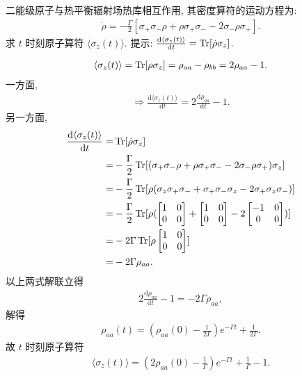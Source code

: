 \documentclass{assignment}
\begin{document}
\begin{prob}
    二能级原子与热平衡辐射场热库相互作用, 其密度算符的运动方程为:
    \begin{align}
        \dot{\rho}=-\frac{\Gamma}{2}[\sigma_+\sigma_-\rho+\rho\sigma_+\sigma_--2\sigma_-\rho\sigma_+].
    \end{align}
    求 $t$ 时刻原子算符 $\langle\sigma_z(t)\rangle$. 提示: $\frac{\mathrm{d}\langle\sigma_z(t)\rangle}{\mathrm{d}t}=\operatorname{Tr}[\dot{\rho}\sigma_z]$.
\end{prob}
\begin{sol}
    \begin{align}
        \langle\sigma_z(t)\rangle=\operatorname{Tr}[\rho\sigma_z]=\rho_{aa}-\rho_{bb}=2\rho_{aa}-1.
    \end{align}
    一方面,
    \begin{align}
        \Longrightarrow\frac{\mathrm{d}\langle\sigma_z(t)\rangle}{\mathrm{d}t}=2\frac{\mathrm{d}\rho_{aa}}{\mathrm{d}t}-1.
    \end{align}
    另一方面,
    \begin{align}
        \notag\frac{\mathrm{d}\langle\sigma_z(t)\rangle}{\mathrm{d}t}=&\operatorname{Tr}[\dot{\rho}\sigma_z]\\
        \notag=&-\frac{\Gamma}{2}\operatorname{Tr}[(\sigma_+\sigma_-\rho+\rho\sigma_+\sigma_--2\sigma_-\rho\sigma_+)\sigma_z]\\
        \notag=&-\frac{\Gamma}{2}\operatorname{Tr}[\rho(\sigma_z\sigma_+\sigma_-+\sigma_+\sigma_-\sigma_z-2\sigma_+\sigma_z\sigma_-)]\\
        \notag=&-\frac{\Gamma}{2}\operatorname{Tr}[\rho(\begin{bmatrix}
            1&0\\
            0&0
        \end{bmatrix}+\begin{bmatrix}
            1&0\\
            0&0
        \end{bmatrix}-2\begin{bmatrix}
            -1&0\\
            0&0
        \end{bmatrix})]\\
        \notag=&-2\Gamma\operatorname{Tr}[\rho\begin{bmatrix}
            1&0\\
            0&0
        \end{bmatrix}]\\
        =&-2\Gamma\rho_{aa}.
    \end{align}
    以上两式解联立得
    \begin{align}
        2\frac{\mathrm{d}\rho_{aa}}{\mathrm{d}t}-1=-2\Gamma\rho_{aa},
    \end{align}
    解得
    \begin{align}
        \rho_{aa}(t)=\left(\rho_{aa}(0)-\frac{1}{2\Gamma}\right)e^{-\Gamma t}+\frac{1}{2\Gamma}.
    \end{align}
    故 $t$ 时刻原子算符
    \begin{align}
        \langle\sigma_z(t)\rangle=\left(2\rho_{aa}(0)-\frac{1}{\Gamma}\right)e^{-\Gamma t}+\frac{1}{\Gamma}-1.
    \end{align}
\end{sol}
\end{document}
